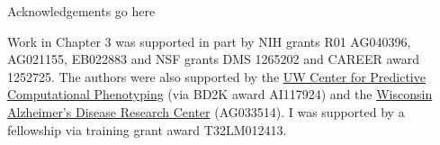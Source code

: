 \begin{acks}
Acknowledgements go here 

Work in Chapter 3 was supported in part by NIH grants R01 AG040396, AG021155, EB022883 
and NSF grants DMS 1265202 and CAREER award 1252725.
The authors were also supported by the \href{http://cpcp.wisc.edu/}{UW Center for Predictive Computational Phenotyping} (via BD2K award AI117924) and the \href{http://www.adrc.wisc.edu/}{Wisconsin Alzheimer's Disease Research Center} (AG033514). 
I was supported by a fellowship via training grant award T32LM012413. 
\end{acks}
